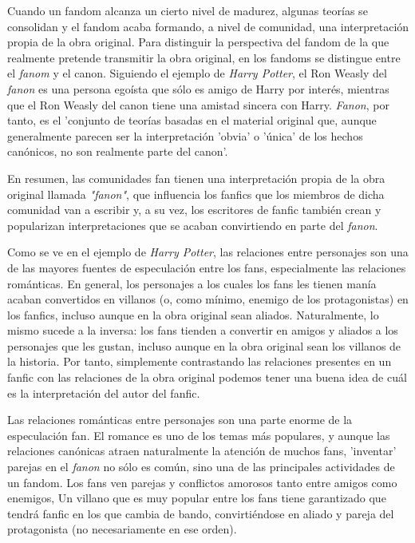 \documentclass{pre-tfg}
\begin{document}
Cuando un fandom alcanza un cierto nivel de madurez, algunas teorías se consolidan y el fandom acaba formando, a nivel de comunidad, una interpretación propia de la obra original. Para distinguir la perspectiva del fandom de la que realmente pretende transmitir la obra original, en los fandoms se distingue entre el \textit{fanom} y el canon. Siguiendo el ejemplo de \textit{Harry Potter}, el Ron Weasly del \textit{fanon} es una persona egoísta que sólo es amigo de Harry por interés, mientras que el Ron Weasly del canon tiene una amistad sincera con Harry. \textit{Fanon}, por tanto, es el 'conjunto de teorías basadas en el material original que, aunque generalmente parecen ser la interpretación 'obvia' o 'única' de los hechos canónicos, no son realmente parte del canon'\cite{uncanny_2017}.



En resumen, las comunidades fan tienen una interpretación propia de la obra original llamada \textit{"fanon"}, que influencia los fanfics que los miembros de dicha comunidad van a escribir y, a su vez, los escritores de fanfic también crean y popularizan interpretaciones que se acaban convirtiendo en parte del \textit{fanon}.

Como se ve en el ejemplo de \textit{Harry Potter}, las relaciones entre personajes son una de las mayores fuentes de especulación entre los fans, especialmente las relaciones románticas. En general, los personajes a los cuales los fans les tienen manía acaban convertidos en villanos (o, como mínimo, enemigo de los protagonistas) en los fanfics, incluso aunque en la obra original sean aliados. Naturalmente, lo mismo sucede a la inversa: los fans tienden a convertir en amigos y aliados a los personajes que les gustan, incluso aunque en la obra original sean los villanos de la historia. Por tanto, simplemente contrastando las relaciones presentes en un fanfic con las relaciones de la obra original podemos tener una buena idea de cuál es la interpretación del autor del fanfic.

Las relaciones románticas entre personajes son una parte enorme de la especulación fan. El romance es uno de los temas más populares, y aunque las relaciones canónicas atraen naturalmente la atención de muchos fans, 'inventar' parejas en el \textit{fanon} no sólo es común, sino una de las principales actividades de un fandom. Los fans ven parejas y conflictos amorosos tanto entre amigos como enemigos, Un villano que es muy popular entre los fans tiene garantizado que tendrá fanfic en los que cambia de bando, convirtiéndose en aliado y pareja del protagonista (no necesariamente en ese orden).
\end{document}
